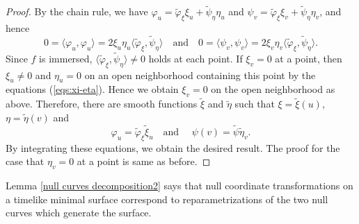 \documentclass[11pt,reqno]{amsart}
\theoremstyle{plain} %
\theoremstyle{definition}
\begin{document}
\begin{proof}
By the chain rule, we have $\varphi_u=\tilde{\varphi}_\xi\xi_u+\tilde{\psi}_\eta \eta_u$ and $\psi_v=\tilde{\varphi}_\xi\xi_v+\tilde{\psi}_\eta \eta_v$, and hence
\begin{equation}\label{eqs:xi-eta}
0=\langle \varphi_u,\varphi_u \rangle=2\xi_u\eta_u\langle \tilde{\varphi}_\xi,\tilde{\psi}_\eta \rangle \quad \text{and}\quad 0=\langle \psi_v,\psi_v \rangle=2\xi_v\eta_v\langle \tilde{\varphi}_\xi, \tilde{\psi}_\eta \rangle.
\end{equation}
Since $f$ is immersed, $\langle \tilde{\varphi}_\xi, \tilde{\psi}_\eta \rangle\neq0$ holds at each point. If $\xi_v=0$ at a point, then $\xi_u\neq0$ and $\eta_u=0$ on an open neighborhood containing this point by the equations (\ref{eqs:xi-eta}). Hence we obtain $\xi_v=0$ on the open neighborhood as above. Therefore, there are smooth functions $\tilde{\xi}$ and $\tilde{\eta}$ such that $\xi=\tilde{\xi}(u)$, $\eta=\tilde{\eta}(v)$ and
 \begin{equation*}
 \varphi_u=\tilde{\varphi}_\xi\tilde{\xi}_u\quad \text{and }\quad \psi(v)=\tilde{\psi}\tilde{\eta}_v.
\end{equation*}
By integrating these equations, we obtain the desired result. The proof for the case that $\eta_v=0$ at a point is same as before.
\end{proof}

Lemma \ref{null curves decomposition2} says that null coordinate transformations on a timelike minimal surface correspond to reparametrizations of the two null curves which generate the surface.
\fi
\end{document}
